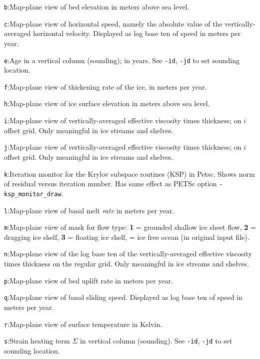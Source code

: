 \documentclass[11pt,final]{amsart}
\begin{document}
\verb|b|:\quad Map-plane view of bed elevation in meters above sea level.

\verb|c|:\quad Map-plane view of horizontal speed, namely the absolute value of the vertically-averaged horizontal velocity.  Displayed as log base ten of speed in meters per year.

\verb|e|:\quad Age in a vertical column (sounding); in years.  See \verb|-id|, \verb|-jd| to set sounding location.

\verb|f|:\quad Map-plane view of thickening rate of the ice, in meters per year.

\verb|h|:\quad Map-plane view of ice surface elevation in meters above sea level.

\verb|i|:\quad Map-plane view of vertically-averaged effective viscosity times thickness; on $i$ offset grid.  Only meaningful in ice streams and shelves.

\verb|j|:\quad Map-plane view of vertically-averaged effective viscosity times thickness; on $i$ offset grid.  Only meaningful in ice streams and shelves.

\verb|k|:\quad \notMat Iteration monitor for the Krylov subspace routines (KSP) in Petsc.  Shows norm of residual versus iteration number.  Has same effect as PETSc option \verb|-ksp_monitor_draw|.

\verb|l|:\quad Map-plane view of basal melt \emph{rate} in meters per year.

\verb|m|:\quad Map-plane view of mask for flow type:  \textbf{1} = grounded shallow ice sheet flow,  \textbf{2} = dragging ice shelf, \textbf{3} = floating ice shelf,  = ice free ocean (in original input file).


\verb|n|:\quad Map-plane view of the log base ten of the vertically-averaged effective viscosity times thickness on the regular grid.  Only meaningful in ice streams and shelves.

\verb|p|:\quad Map-plane view of bed uplift rate in meters per year.

\verb|q|:\quad Map-plane view of basal sliding speed.  Displayed as log base ten of speed in meters per year.

\verb|r|:\quad Map-plane view of surface temperature in Kelvin.

\verb|s|:\quad Strain heating term $\Sigma$ in vertical column (sounding).  See \verb|-id|, \verb|-jd| to set sounding location.
\end{document}
